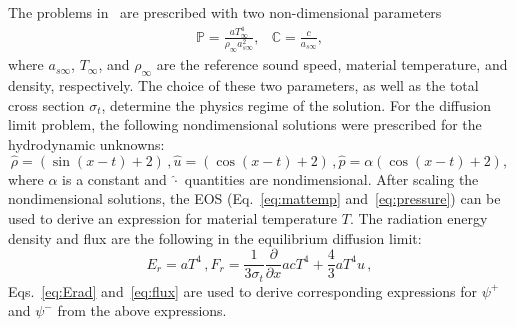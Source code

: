 \documentclass[preprint,12pt]{elsarticle}
\newcommand{\dxdy}[2]{\frac{\partial #1}{\partial #2}}
\newcommand{\pec}{\, ,}
\newcommand{\E}{{E_r}}
\newcommand{\F}{{F_r}}
\begin{document}
The problems in~\cite{mcclarren2} are prescribed with two non-dimensional parameters
\begin{equation}
    \label{eq:ndim_params}
    \begin{matrix}
        \mathbb{P} = {\displaystyle \frac{a T_{\infty}^4}{\rho_{\infty} a_{s\infty}^2} }, &  
        \mathbb{C} = {\displaystyle \frac{c}{a_{s\infty}} },
    \end{matrix}
\end{equation}
where $a_{s\infty}$, $T_{\infty}$, and $\rho_{\infty}$ are the reference sound speed,
material temperature, and density, respectively.  The choice of these two parameters, as
well as the total cross section $\sigma_t$, determine the physics regime of the solution.
%
For the diffusion limit problem, the following nondimensional solutions were prescribed
for the hydrodynamic unknowns:
\begin{subequations}
   \begin{equation} 
     \hat \rho = \left(\sin(x - t) + 2\right) \pec
   \end{equation} 
   \begin{equation}
     \hat  u = \left(\cos(x - t) + 2\right) \pec 
   \end{equation} 
   \begin{equation} 
      \hat p = \alpha\left(\cos(x - t) + 2\right) ,
   \end{equation}
\end{subequations}
where $\alpha$ is a constant and $\hat \cdot$ quantities are nondimensional.  After
scaling the nondimensional solutions, the EOS (Eq.~\eqref{eq:mattemp} and~\eqref{eq:pressure}) can be used
to derive an expression for material temperature $T$.
 The radiation energy density and flux are the following in the equilibrium diffusion limit:
\begin{subequations}
   \begin{equation} 
     \E = aT^4 \pec
   \end{equation}
   \begin{equation} 
       \F = \frac{1}{3\sigma_t}\dxdy{}{x} a c T^4 +
\frac{4}{3} a T^4u 
\pec \end{equation} 
\end{subequations}
Eqs.~\eqref{eq:Erad} and~\eqref{eq:flux} are used to derive corresponding expressions for $\psi^+$ and $\psi^-$ from the above expressions.
\end{document}

